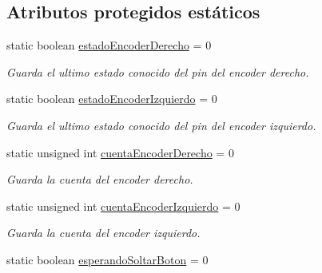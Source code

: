 \subsection*{Atributos protegidos estáticos}
\begin{DoxyCompactItemize}
\item 
\hypertarget{classVelocistaEdu_a48796ee6f8f1c128ab01590b1bce3b15}{static boolean \hyperlink{classVelocistaEdu_a48796ee6f8f1c128ab01590b1bce3b15}{estado\-Encoder\-Derecho} = 0}\label{classVelocistaEdu_a48796ee6f8f1c128ab01590b1bce3b15}

\begin{DoxyCompactList}\small\item\em Guarda el ultimo estado conocido del pin del encoder derecho. \end{DoxyCompactList}\item 
\hypertarget{classVelocistaEdu_a729e902ea3de6fefc0dcade05ffbadd2}{static boolean \hyperlink{classVelocistaEdu_a729e902ea3de6fefc0dcade05ffbadd2}{estado\-Encoder\-Izquierdo} = 0}\label{classVelocistaEdu_a729e902ea3de6fefc0dcade05ffbadd2}

\begin{DoxyCompactList}\small\item\em Guarda el ultimo estado conocido del pin del encoder izquierdo. \end{DoxyCompactList}\item 
\hypertarget{classVelocistaEdu_ab4189c2ebbfd422b08f378fb7682777b}{static unsigned int \hyperlink{classVelocistaEdu_ab4189c2ebbfd422b08f378fb7682777b}{cuenta\-Encoder\-Derecho} = 0}\label{classVelocistaEdu_ab4189c2ebbfd422b08f378fb7682777b}

\begin{DoxyCompactList}\small\item\em Guarda la cuenta del encoder derecho. \end{DoxyCompactList}\item 
\hypertarget{classVelocistaEdu_a92b0bb2c8ffc67ecb71fc725f03157b8}{static unsigned int \hyperlink{classVelocistaEdu_a92b0bb2c8ffc67ecb71fc725f03157b8}{cuenta\-Encoder\-Izquierdo} = 0}\label{classVelocistaEdu_a92b0bb2c8ffc67ecb71fc725f03157b8}

\begin{DoxyCompactList}\small\item\em Guarda la cuenta del encoder izquierdo. \end{DoxyCompactList}\item 
\hypertarget{classVelocistaEdu_a8a33ff5b30caff9c7a368006ea9dcd38}{static boolean \hyperlink{classVelocistaEdu_a8a33ff5b30caff9c7a368006ea9dcd38}{esperando\-Soltar\-Boton} = 0}\label{classVelocistaEdu_a8a33ff5b30caff9c7a368006ea9dcd38}


\end{DoxyCompactItemize}
